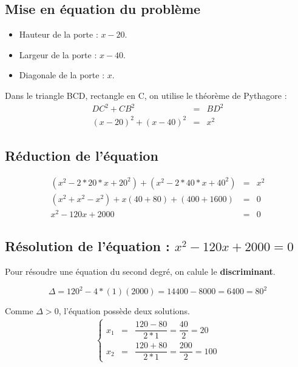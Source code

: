 \documentclass[11pt]{article}
\begin{document}
\noindent\hrulefill

\begin{multicols}{2}

  \subsection{Mise en équation du problème}
  
  \begin{itemize}
  \item Hauteur de la porte : $x - 20$.
  \item Largeur de la porte : $x - 40$.
  \item Diagonale de la porte : $x$.
  \end{itemize}
  
  Dans le triangle BCD, rectangle en C, on utilise le théorème de Pythagore :\\

  \begin{eqnarray*}
    DC^2 + CB^2 & = & BD^2\\
    (x-20)^2 + (x - 40)^2 & = & x^2
  \end{eqnarray*}



  \subsection{Réduction de l'équation}

  \begin{eqnarray*}
    (x^2 - 2*20*x + 20^2) + (x^2 - 2*40*x + 40^2) &=& x^2\\
    (x^2 + x^2 - x^2) + x(40 + 80) + (400 + 1600) &=& 0\\
    x^2 - 120x + 2000 &=& 0
  \end{eqnarray*}



  \subsection{Résolution de l'équation : $ x^2 - 120x + 2000 = 0$}
  Pour résoudre une équation du second degré, on calule le \textbf{discriminant}.

  $$\Delta = 120^2 - 4*(1)(2000) = 14400 - 8000 = 6400 = 80^2$$
  
  Comme $\Delta > 0$, l'équation possède deux solutions.
  \begin{eqnarray*}
    \left\{
    \begin{aligned}
      x_1 &=& \dfrac{120 - 80}{2*1} = \dfrac{40}{2} = 20\\
      x_2 &=& \dfrac{120 + 80}{2*1} = \dfrac{200}{2} = 100
    \end{aligned}
    \right.
  \end{eqnarray*}


\end{multicols}
\end{document}

